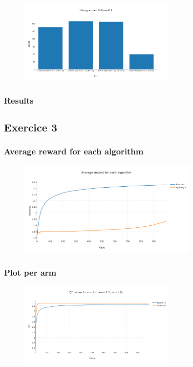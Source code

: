 \documentclass[11pt]{article}
\begin{document}
\begin{figure}[H]
   \centering
   \includegraphics[width=0.7\textwidth]{img/1-2/h6.png}
\end{figure}


\subsubsection{Results}

\subsection{Exercice 3}


\subsubsection{Average reward for each algorithm}

\begin{figure}[H]
   \centering
   \includegraphics[width=0.8\textwidth]{img/1-3/reward.png}
\end{figure}

\subsubsection{Plot per arm}

\begin{figure}[H]
   \centering
   \includegraphics[width=0.7\textwidth]{img/1-3/q1.png}
\end{figure}
\end{document}

